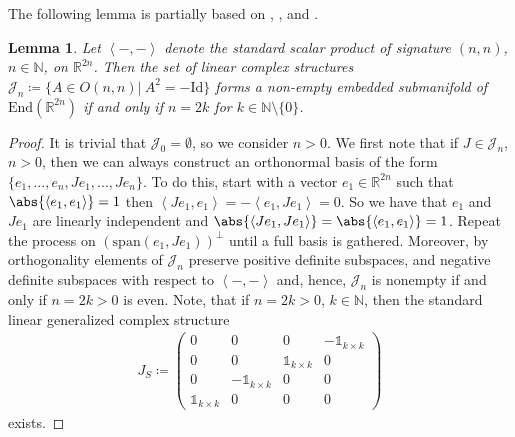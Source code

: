 \documentclass[12pt,a4paper]{article}
\theoremstyle{plain}
\newtheorem{lemma}[theorem]{Lemma}
\theoremstyle{definition}
\newcommand{\R}{\mathbb{R}}
\newcommand{\N}{\mathbb{N}}
\newcommand{\scal}[2]{\left\langle #1,#2\right\rangle}
\newcommand{\Jcal}{\mathcal{J}}
\begin{document}
The following lemma is partially based on \cite[p.~43]{gualtieri}, \cite[Corollary 3.8.10]{gauge}, and \cite[Chapter II, Section 2.13, p.~65]{montgomery2018topological}.
\begin{lemma}
\label{Lemma:LinGACSSubmanifold}
Let $\scal{-}{-}$ denote the standard scalar product of signature $(n,n)$, $n\in\N$, on $\R^{2n}$. Then the set of linear complex structures $\Jcal_{n}\coloneqq \{A\in O(n,n)|~A^2=-\mathrm{Id}\}$ forms a non-empty embedded submanifold of $\mathrm{End}(\R^{2n})$ if and only if $n=2k$ for $k\in \N\setminus \{0\}$.
\end{lemma}
\begin{proof}
It is trivial that $\Jcal_0= \emptyset$, so we consider $n>0$.
We first note that if $J\in \Jcal_n$, $n>0$, then we can always construct an orthonormal basis of the form $\{e_1,...,e_n,Je_1,...,Je_n\}$. To do this, start with a vector $e_1\in \R^{2n}$ such that $\abs{\scal{e_1}{e_1}}=1$ then $\scal{Je_1}{e_1}=-\scal{e_1}{Je_1}=0$. So we have that $e_1$ and $Je_1$ are linearly independent and $\abs{\scal{Je_1}{Je_1}}=\abs{\scal{e_1}{e_1}}=1$. Repeat the process on $(\mathrm{span}(e_1,Je_1))^\perp$ until a full basis is gathered. Moreover, by orthogonality elements of $\Jcal_n$ preserve positive definite subspaces, and negative definite subspaces with respect to $\scal{-}{-}$ and, hence, $\Jcal_n$ is nonempty if and only if $n=2k>0$ is even.
Note, that if $n=2k>0$, $k\in \N$, then the standard linear generalized complex structure
\begin{align*}
    J_S\coloneqq
    \begin{pmatrix}
        0&0 & 0 &-\mathds{1}_{k\times k}\\
        0&0 & \mathds{1}_{k\times k} &0 \\
        0 &-\mathds{1}_{k\times k} & 0&0 \\
        \mathds{1}_{k\times k} &0 &0 &0 
    \end{pmatrix}
\end{align*}
exists.


\end{proof}
\end{document}
